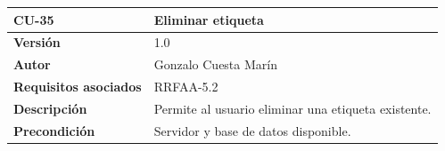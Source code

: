 \documentclass[
]{article}
\begin{document}
\begin{longtable}[]{@{}ll@{}}
\toprule
\begin{minipage}[b]{0.22\columnwidth}\raggedright
\textbf{CU-35}\strut
\end{minipage} & \begin{minipage}[b]{0.72\columnwidth}\raggedright
\textbf{Eliminar etiqueta}\strut
\end{minipage}\tabularnewline
\midrule
\endhead
\begin{minipage}[t]{0.22\columnwidth}\raggedright
\textbf{Versión}\strut
\end{minipage} & \begin{minipage}[t]{0.72\columnwidth}\raggedright
1.0\strut
\end{minipage}\tabularnewline
\begin{minipage}[t]{0.22\columnwidth}\raggedright
\textbf{Autor}\strut
\end{minipage} & \begin{minipage}[t]{0.72\columnwidth}\raggedright
Gonzalo Cuesta Marín\strut
\end{minipage}\tabularnewline
\begin{minipage}[t]{0.22\columnwidth}\raggedright
\textbf{Requisitos asociados}\strut
\end{minipage} & \begin{minipage}[t]{0.72\columnwidth}\raggedright
RRFAA-5.2\strut
\end{minipage}\tabularnewline
\begin{minipage}[t]{0.22\columnwidth}\raggedright
\textbf{Descripción}\strut
\end{minipage} & \begin{minipage}[t]{0.72\columnwidth}\raggedright
Permite al usuario eliminar una etiqueta existente.\strut
\end{minipage}\tabularnewline
\begin{minipage}[t]{0.22\columnwidth}\raggedright
\textbf{Precondición}\strut
\end{minipage} & \begin{minipage}[t]{0.72\columnwidth}\raggedright
Servidor y base de datos disponible.


\end{minipage}
\end{longtable}
\end{document}
